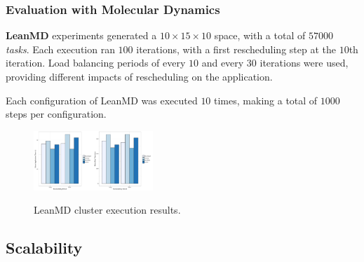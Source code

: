 \subsubsection*{Evaluation with Molecular Dynamics}

\textbf{LeanMD} experiments generated a $10\times15\times10$ space, with a total of $57000$ \textit{tasks}.
Each execution ran $100$ iterations, with a first rescheduling step at the $10$th iteration. 
Load balancing periods of every $10$ and every $30$ iterations were used, providing different impacts of rescheduling on the application.

Each configuration of LeanMD was executed $10$ times, making a total of $1000$ steps per configuration. 


\begin{figure}
	\centering
    \includegraphics[width=0.2\textwidth]{images/apptime_leanmd_g5k.pdf}\includegraphics[width=0.2\textwidth]{images/steptime_leanmd_g5k.pdf}
    \caption{LeanMD cluster execution results.}
    \label{fig:eval:g5k:leanmd:time}
\end{figure}

\subsection{Scalability}
